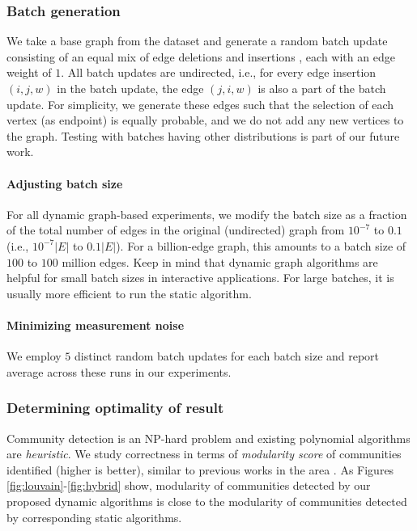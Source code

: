 \subsubsection{Batch generation}
\label{sec:batch-update}

We take a base graph from the dataset and generate a random batch update \cite{com-zarayeneh21} consisting of an equal mix of edge deletions and insertions \cite{com-chong13}, each with an edge weight of $1$. All batch updates are undirected, i.e., for every edge insertion $(i, j, w)$ in the batch update, the edge $(j, i, w)$ is also a part of the batch update. For simplicity, we generate these edges such that the selection of each vertex (as endpoint) is equally probable, and we do not add any new vertices to the graph. Testing with batches having other distributions is part of our future work.



\paragraph{Adjusting batch size}

For all dynamic graph-based experiments, we modify the batch size as a fraction of the total number of edges in the original (undirected) graph from $10^{-7}$ to $0.1$ (i.e., $10^{-7}|E|$ to $0.1|E|$). For a billion-edge graph, this amounts to a batch size of $100$ to $100$ million edges. Keep in mind that dynamic graph algorithms are helpful for small batch sizes in interactive applications. For large batches, it is usually more efficient to run the static algorithm.

\paragraph{Minimizing measurement noise}

We employ $5$ distinct random batch updates for each batch size and report average across these runs in our experiments.


\subsubsection{Determining optimality of result}
\label{sec:evaluation--optimality}

Community detection is an NP-hard problem and existing polynomial algorithms are \textit{heuristic}. We study correctness in terms of \textit{modularity score} of communities identified (higher is better), similar to previous works in the area \cite{com-traag19, com-zarayeneh21}. As Figures \ref{fig:louvain}-\ref{fig:hybrid} show, modularity of communities detected by our proposed dynamic algorithms is close to the modularity of communities detected by corresponding static algorithms.

